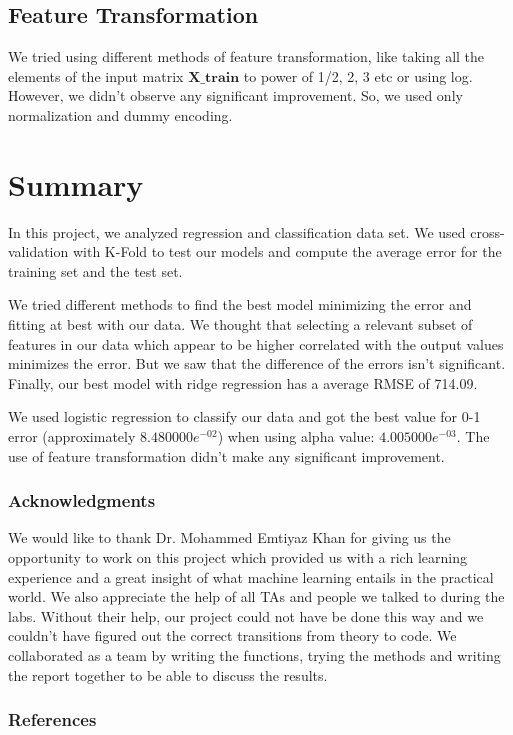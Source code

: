\documentclass{article} %
\begin{document}
\subsection{Feature Transformation}
We tried using different methods of feature transformation, like taking all the elements of the input matrix $\mathbf{X\_train}$ to power of 1/2, 2, 3 etc or using log. However, we didn't observe any significant improvement. So, we used only normalization and dummy encoding. 

\section{Summary}
In this project, we analyzed regression and classification data set. We used cross-validation with K-Fold to test our models and compute the average error for the training set and the test set.

We tried different methods to find the best model minimizing the error and fitting at best with our data. We thought that selecting a relevant subset of features in our data which appear to be higher correlated with the output values minimizes the error. But we saw that the difference of the errors isn't significant. Finally, our best model with ridge regression has a average RMSE of 714.09.

We used logistic regression to classify our data and got the best value for 0-1 error (approximately $8.480000e^{-02}$) when using alpha value: $4.005000e^{-03}$. The use of feature transformation didn't make any significant improvement. 


\subsubsection*{Acknowledgments}
We would like to thank Dr. Mohammed Emtiyaz Khan for giving us the opportunity to work on this project which provided us with a rich learning experience and a great insight of what machine learning entails in the practical world. We also appreciate the help of all TAs and people we talked to during the labs. Without their help, our project could not have be done this way and we couldn't have figured out the correct transitions from theory to code. We collaborated as a team by writing the functions, trying the methods and writing the report together to be able to discuss the results.   

\subsubsection*{References}
\end{document}
